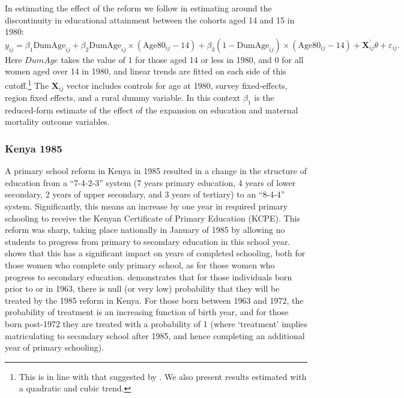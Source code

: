 \documentclass{article}[12pt,subeqn]
\begin{document}
\begin{spacing}{1.4}
In estimating the effect of the reform we follow \citet{AgueroBharawadj2011} in 
estimating around the discontinuity in educational attainment between the cohorts 
aged 14 and 15 in 1980: 
\begin{equation}
\label{eqn:Zimbabwe}
    y_{ij}=\beta_1\text{DumAge}_{ij}+
    \beta_2\text{DumAge}_{ij}\times(\text{Age}80_{ij}-14)+
    \beta_3(1-\text{DumAge}_{ij})\times(\text{Age}80_{ij}-14)+ 
    \textbf{X}^\prime_{ij}\theta+\varepsilon_{ij}.
\end{equation}
Here $DumAge$ takes the value of 1 for those aged 14 or less in 1980, and 0 for 
all women aged over 14 in 1980, and linear trends are fitted on each side of this 
cutoff.\footnote{This is in line with that suggested by 
\citet{AgueroBharawadj2011}.  We also present results estimated with a quadratic 
and cubic trend.} The $\textbf{X}_{ij}$ vector includes controls for age at 1980, 
survey fixed-effects, region fixed effects, and a rural dummy variable.  In this 
context $\beta_1$ is the reduced-form estimate of the effect of the expansion on 
education and maternal mortality outcome variables.

\subsubsection{Kenya 1985}
\label{ssscn:empiricsKenya}
A primary school reform in Kenya in 1985 resulted in a change in the structure of 
education from a ``7-4-2-3'' system (7 years primary education, 4 years of lower 
secondary, 2 years of upper secondary, and 3 years of tertiary) to an ``8-4-4'' 
system. Significantly, this means an increase by one year in required primary 
schooling to receive the Kenyan Certificate of Primary Education (KCPE). This 
reform was sharp, taking place nationally in January of 1985 by allowing no 
students to progress from primary to secondary education in this school 
year. \citet{Chicoine2011} shows that this has a significant impact on years of 
completed schooling, both for those women who complete only primary school, as for 
those women who progress to secondary education. \citet{Chicoine2011} demonstrates 
that for those individuals born prior to or in 1963, there is null (or very low)
probability that they will be treated by the 1985 reform in Kenya. For those born 
between 1963 and 1972, the probability of treatment is an increasing function of 
birth year, and for those born post-1972 they are treated with a probability of 1 
(where `treatment' implies matriculating to secondary school after 1985, and hence 
completing an additional year of primary schooling).


\end{spacing}
\end{document}
